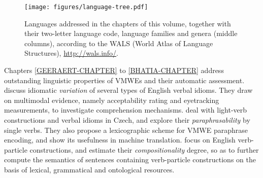 \documentclass[output=paper,
modfonts,
]{langscibook}
\begin{document}
\begin{figure}
\texttt{[image: figures/language-tree.pdf]}
\caption{Languages addressed in the chapters of this volume, together with their two-letter language code, language families and genera (middle columns), according to the WALS (World Atlas of Language Structures), \url{http://wals.info/}.}
\label{preface:fig:language-tree}
\end{figure}







Chapters \ref{GEERAERT-CHAPTER} to \ref{BHATIA-CHAPTER}
address outstanding linguistic properties of VMWEs and their automatic assessment.   discuss idiomatic \emph{variation} of several types of English verbal idioms. They %
draw on multimodal evidence, namely acceptability rating and eyetracking measurements, to investigate comprehension mechanisms.  deal with light-verb constructions and verbal idioms in Czech, and explore their \emph{paraphrasability} by single verbs. They also propose a lexicographic scheme for VMWE paraphrase encoding, and show its usefulness in machine translation.   focus on English verb-particle constructions, and estimate their \emph{compositionality} degree, so as to further compute the semantics of sentences containing verb-particle constructions %
on the basis of lexical, grammatical and ontological resources.
\end{document}
